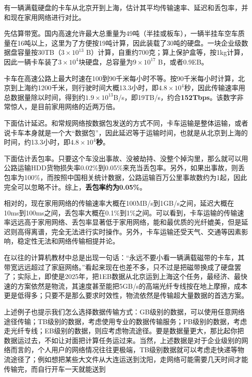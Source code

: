 \begin{example}
  有一辆满载硬盘的卡车从北京开到上海，估计其平均传输速率、延迟和丢包率，并和现在家用网络进行对比。
\end{example}

\begin{answer}
  先估算带宽。国内高速允许最大总重量为49吨（半挂或板车），一辆半挂车空车质量在16吨以上，这里为了方便按19吨计算，因此装载了30吨的硬盘。一块企业级数据盘容量按30TB（$3\times 10^{13}$ B）计算，自重约700克；算上保护盒等，按1kg计算，因此一辆卡车装了$3\times 10^4$块硬盘，总容量为$9\times 10^{17}$ B，或者0.9EB。

  卡车在高速公路上最大时速在100到90千米每小时不等。按90千米每小时计算，北京到上海约1200千米，则行驶时间大概13.3小时，即$4.8\times 10^4$秒，因此传输速率用总数据量除以时间，得到约$1.9\times 10^{13}$B/s，即19TB/s，约合\textbf{152Tbps}。该数字非常惊人，是目前家用网络的近两万倍。

  下面估计延迟。和常规网络按数据包发送的方式不同，卡车运输是整体运输，或者说卡车本身就是一个大“数据包”，因此延迟等于运输时间，也就是从北京到上海的时间，约13.3小时，即\textbf{$4.8\times 10^4$秒}。

  下面估计丢包率。只要这个车没出事故、没被劫持、没整个掉沟里，那么就可以用公路运输HDD货物损失率0.02\%到0.05\%来充当丢包率。另外，如果出事故，则丢包率为100\%，而按照中国相关统计数据，公路运输百万公里事故数约为1起，因此完全可以忽略不计。综上，\textbf{丢包率约为0.05\%}。

  相对的，现在家用网络的传输速率大概在100MB/s到1GB/s之间，延迟大概在10ms到100ms之间，丢包率大概在0.1\%到1\%之间。可以看到，卡车运输的传输速率远远高于家用网络、丢包率显著低于家用网络，能和最优质的光纤媲美，但是延迟则高得离谱，完全无法进行实时操作。另外，卡车运输还受天气、交通等因素影响，稳定性无法和网络传输相提并论。
\end{answer}

在以往的计算机教材中总是出现一句话：“永远不要小看一辆满载磁带的卡车，其带宽远远超过了家庭网络。”看起来现在也差不多，只不过是把磁带换成了硬盘罢了；实际上，即使是2025年，把1EB数据从北京运到上海这个任务，最经济、最快速的方案依然是物流，其速度甚至能把5GB/s的高端光纤专线按在地上摩擦，成本更是低得多；只要不是那么要求时效性，物流依然是传输超大量数据的首选方案。

上述例子也提示我们怎么选择数据传输方式：GB级别的数据，可以使用任意网络途径传输；TB级别的数据，考虑使用专业的数据传输服务；PB级别的数据，考虑走光纤专线；EB级别的数据，则应考虑物流途径。要是数据量更大，那比起你把数据运过去，不如让对面把计算任务运过来。当然，上述数据是对于企业级别的网络而言的，个人用户的网络情况往往更极端，TB级别数据就可以考虑走快递等物流途径了；例如想把某些大文件从大连运送到沈阳，走网络可能需要几天时间才能传输完，而自行开车一天就能送到

